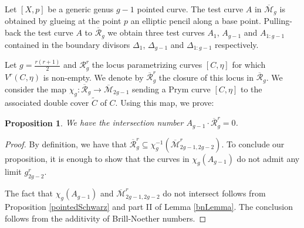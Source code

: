 \documentclass{article}
\theoremstyle{plain}
\newtheorem{prop}[trm]{Proposition}
\theoremstyle{definition}
\def\cR{\mathcal{R}}
\def\rr{\overline{\mathcal{R}}}
\def\mm{\overline{\mathcal{M}}}
\begin{document}
Let $[X,p]$ be a generic genus $g-1$ pointed curve. The test curve $A$ in $\mm_g$ is obtained by glueing at the point $p$ an elliptic pencil along a base point. Pulling-back the test curve $A$ to $\rr_g$ we obtain three test curves $A_1$, $A_{g-1}$ and $A_{1:g-1}$ contained in the boundary divisors $\Delta_1$, $\Delta_{g-1}$ and $\Delta_{1:g-1}$ respectively.

Let $g = \frac{r(r+1)}{2}$ and $\cR_g^r$ the locus parametrizing curves $[C,\eta]$ for which $V^r(C,\eta)$ is non-empty. We denote by $\rr^r_g$ the closure of this locus in $\rr_g$. We consider the map $\chi_g\colon \rr_g \rightarrow \mm_{2g-1}$ sending a Prym curve $[C,\eta]$ to the associated double cover $\widetilde{C}$ of $C$. Using this map, we prove:
\begin{prop} \label{testA_g-1}
	We have the intersection number  $A_{g-1} \cdot \rr_g^r = 0$.
\end{prop} 
\begin{proof}
	By definition, we have that $\rr^r_g \subseteq \chi_g^{-1}(\mm_{2g-1,2g-2}^r)$. 
	To conclude our proposition, it is enough to show that the curves in $\chi_g(A_{g-1})$ do not admit any limit $g^r_{2g-2}$. 
		
	The fact that  $\chi_g(A_{g-1})$ and $\mm_{2g-1,2g-2}^r$ do not intersect follows from Proposition \ref{pointedSchwarz} and part II of Lemma \ref{bnLemma}. The conclusion follows from the additivity of Brill-Noether numbers. 
\end{proof}
\end{document}
